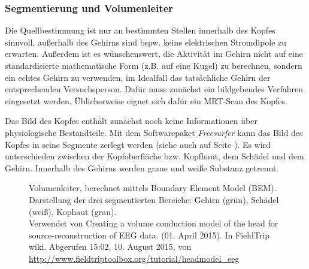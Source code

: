 \documentclass[doc,a4paper,12pt]{apa6}
\makeatletter
\DeclareRobustCommand*{\nameref}[1]{%
      \glqq{\myorg@nameref{#1}}\grqq%
    }%
\makeatother
\begin{document}
\subsubsection{Segmentierung und Volumenleiter}
\label{sec:segment}

Die Quellbestimmung ist nur an bestimmten Stellen innerhalb des Kopfes sinnvoll, außerhalb des Gehirns sind bspw. keine elektrischen Stromdipole zu erwarten. Außerdem ist es wünschenswert, die Aktivität im Gehirn nicht auf eine standardisierte mathematische Form (z.B. auf eine Kugel) zu berechnen, sondern ein echtes Gehirn zu verwenden, im Idealfall das tatsächliche Gehirn der entsprechenden Versuchsperson. Dafür muss zunächst ein bildgebendes Verfahren eingesetzt werden. Üblicherweise eignet sich dafür ein MRT-Scan des Kopfes.

Das Bild des Kopfes enthält zunächst noch keine Informationen über physiologische Bestandteile. Mit dem Softwarepaket \emph{Freesurfer} kann das Bild des Kopfes in seine Segmente zerlegt werden (siehe auch \nameref{sec:head-struct} auf Seite \pageref{sec:head-struct}). Es wird unterschieden zwischen der Kopfoberfläche bzw. Kopfhaut, dem Schädel und dem Gehirn. Innerhalb des Gehirns werden graue und weiße Substanz getrennt.

\begin{figure}[t]
  \centering
  \vspace*{3mm}
  \caption[Volumenleiter, berechnet mittels Boundary Element Model (BEM)]{Volumenleiter, berechnet mittels Boundary Element Model (BEM). Darstellung der drei segmentierten Bereiche: Gehirn (grün), Schädel (weiß), Kophaut (grau).\\ Verwendet von \glqq Creating a volume conduction model of the head for source-reconstruction of EEG data\grqq . (01. April 2015). In FieldTrip wiki. Abgerufen 15:02, 10. August 2015, von \url{http://www.fieldtriptoolbox.org/tutorial/headmodel_eeg}}
  \label{img:bem}
\end{figure}
\end{document}
